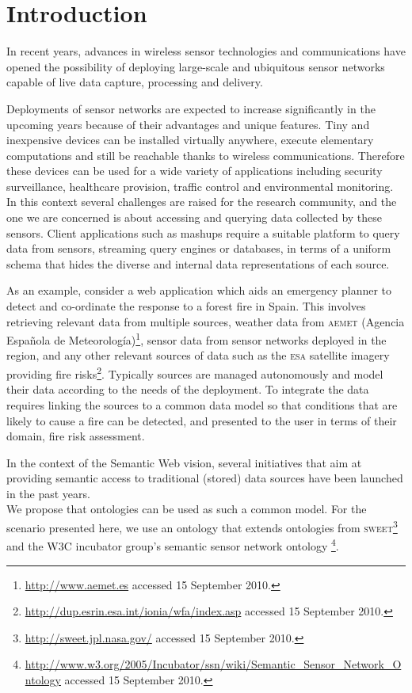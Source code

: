 \section{Introduction}
\label{intro}

In recent years, advances in wireless sensor technologies and communications have opened the possibility of deploying large-scale and ubiquitous sensor networks capable of live data capture, processing and delivery.
 
Deployments of sensor networks are expected to increase significantly in the upcoming years because of their advantages and unique features. Tiny and inexpensive devices can be installed virtually anywhere, execute elementary computations and still be reachable thanks to wireless communications. Therefore these devices can be used for a wide variety of applications including security surveillance, healthcare provision, traffic control and environmental monitoring.
In this context several challenges are raised for the research community, and the one we are concerned is about accessing and querying data collected by these sensors. Client applications such as mashups require a suitable platform to query data from sensors, streaming query engines or databases, in terms of a uniform schema that hides the diverse and internal data representations of each source.

As an example, consider a web application which aids an emergency planner to detect and co-ordinate the response to a forest fire in Spain. 
This involves retrieving relevant data from multiple sources, \eg weather data from \textsc{aemet} (Agencia Espa\~nola de Meteorolog\'ia)\footnote{\url{http://www.aemet.es} accessed 15 September 2010.}, sensor data from sensor networks deployed in the region, and any other relevant sources of data such as the \textsc{esa} satellite imagery providing fire risks\footnote{\url{http://dup.esrin.esa.int/ionia/wfa/index.asp} accessed 15 September 2010.}. 
Typically sources are managed autonomously and model their data according to the needs of the deployment. 
To integrate the data requires linking the sources to a common data model so that conditions that are likely to cause a fire can be detected, and presented to the user in terms of their domain, \eg fire risk assessment. 

In the context of the Semantic Web vision, several initiatives that aim at providing semantic access to traditional (stored) data sources have been launched in the past years.
\\
We propose that ontologies can be used as such a common model. 
For the scenario presented here, we use an ontology that extends ontologies from \textsc{sweet}\footnote{\url{http://sweet.jpl.nasa.gov/} accessed 15 September 2010.} and the W3C incubator group's semantic sensor network ontology
\footnote{\url{http://www.w3.org/2005/Incubator/ssn/wiki/Semantic_Sensor_Network_Ontology} accessed 15 September 2010.}.


